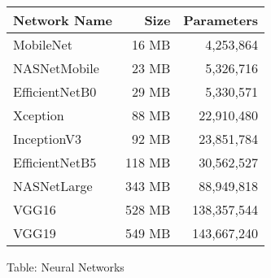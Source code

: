 \begin{tabular}{| l | r | r |}
    \hline
    Network Name   & Size    & Parameters \\ \hline\hline
    MobileNet      & 16 MB   &   4,253,864 \\ \hline
    NASNetMobile   & 23 MB   &   5,326,716 \\ \hline
    EfficientNetB0 & 29 MB   &   5,330,571 \\ \hline\hline
 
    Xception       & 88 MB   &  22,910,480 \\ \hline
    InceptionV3    & 92 MB   &  23,851,784 \\ \hline
    EfficientNetB5 & 118 MB  &  30,562,527 \\ \hline\hline

    NASNetLarge    & 343 MB  &  88,949,818 \\ \hline
    VGG16          & 528 MB  & 138,357,544 \\ \hline
    VGG19          & 549 MB  & 143,667,240 \\ \hline
\end{tabular}
\caption{Table: Neural Networks}